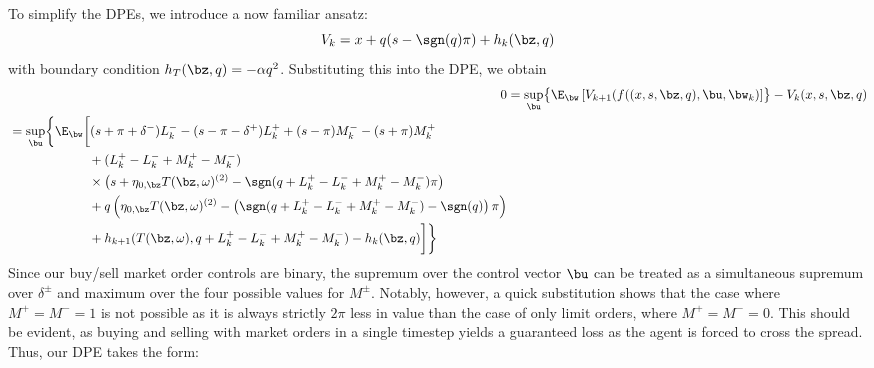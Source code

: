 \documentclass[12pt]{article}
\begin{document}
To simplify the DPEs, we introduce a now familiar ansatz:
\begin{equation}
\label{eq:ansatzHcase1discrete}
V_k = x + q(s-\sgn(q)\pi) + h_k(\bz,q)
\end{equation}
with boundary condition $h_T(\bz,q) = -\alpha q^2$. Substituting this into the DPE, we obtain
\begin{align}
0 & = \sup_{\bu} \bigl\lbrace \E_{\bw} \left[ V_{k+1} (f((x,s,\bz,q),\bu,\bw_k) \right] \bigr\rbrace - V_k (x,s,\bz,q)  \nonumber \\
\begin{split} & = \sup_{\bu} \biggl\lbrace \E_{\bw} \biggl[
(s + \pi + \delta^-)L_k^- - (s - \pi - \delta^+)L_k^+ + (s - \pi)M_k^- - (s + \pi)M_k^+ \\
& \hphantom{\sup_{\bu} \biggl\lbrace \E_{\bw} \biggl[ {}+{}} + (L_k^+ - L_k^- + M_k^+ - M_k^-) \\
& \hphantom{\sup_{\bu} \biggl\lbrace \E_{\bw} \biggl[ {}+{}} \times \bigl( s + \eta_{0,\bz} T(\bz, \omega)^{(2)}  -\sgn( q + L_k^+ - L_k^- + M_k^+ - M_k^-)\pi   \bigr) \\
& \hphantom{\sup_{\bu} \biggl\lbrace \E_{\bw} \biggl[ {}+{}} + q\left( \eta_{0,\bz} T(\bz, \omega)^{(2)}  -\left( \sgn( q + L_k^+ - L_k^- + M_k^+ - M_k^-) - \sgn(q) \right) \pi \right) \\
& \hphantom{\sup_{\bu} \biggl\lbrace \E_{\bw} \biggl[ {}+{}} + h_{k+1}(T(\bz,\omega), q + L_k^+ - L_k^- + M_k^+ - M_k^-) -  h_k(\bz,q) \biggr] \biggr\rbrace 
\end{split}
\end{align}
Since our buy/sell market order controls are binary, the supremum over the control vector $\bu$ can be treated as a simultaneous supremum over $\delta^\pm$ and maximum over the four possible values for $M^\pm$. Notably, however, a quick substitution shows that the case where $M^+ = M^- = 1$ is not possible as it is always strictly $2\pi$ less in value than the case of only limit orders, where $M^+ = M^- = 0$. This should be evident, as buying and selling with market orders in a single timestep yields a guaranteed loss as the agent is forced to cross the spread. Thus, our DPE takes the form:
\end{document}
